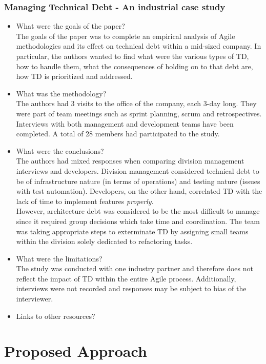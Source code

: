 \documentclass{mprop}
\begin{document}
\subsubsection{Managing Technical Debt - An industrial case study} \cite{Codabux2013}
\begin{itemize}
\item What were the goals of the paper? \\
The goals of the paper was to complete an empirical analysis of Agile methodologies and its effect on technical debt within a mid-sized company.
In particular, the authors wanted to find what were the various types of TD, how to handle them, what the consequences of holding on to that debt are, how TD is prioritized and addressed.
\item What was the methodology? \\
The authors had 3 visits to the office of the company, each 3-day long.
They were part of team meetings such as sprint planning, scrum and retrospectives.
Interviews with both management and development teams have been completed.
A total of 28 members had participated to the study.
\item What were the conclusions? \\
The authors had mixed responses when comparing division management interviews and developers.
Division management considered technical debt to be of infrastructure nature (in terms of operations) and testing nature (issues with test automation).
Developers, on the other hand, correlated TD with the lack of time to implement features \textit{properly}.\\
However, architecture debt was considered to be the most difficult to manage since it required group decisions which take time and coordination.
The team was taking appropriate steps to exterminate TD by assigning small teams within the division solely dedicated to refactoring tasks.
\item What were the limitations? \\
The study was conducted with one industry partner and therefore does not reflect the impact of TD within the entire Agile process.
Additionally, interviews were not recorded and responses may be subject to bias of the interviewer.
\item Links to other resources? \\
\end{itemize}

\section{Proposed Approach}
\end{document}
